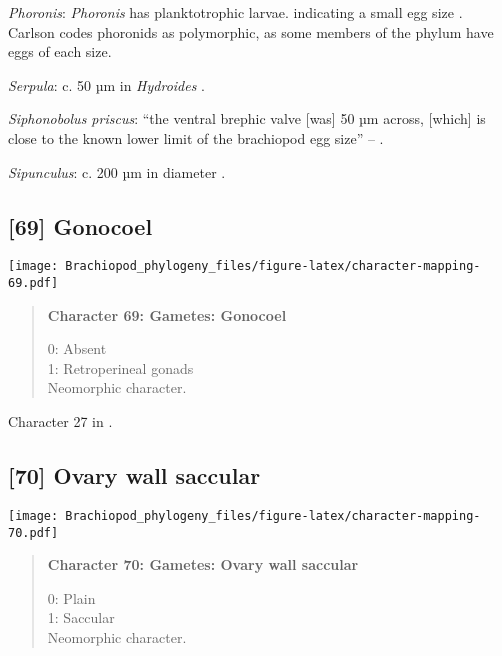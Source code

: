\documentclass[openany]{book}
\theoremstyle{definition}
\theoremstyle{definition}
\theoremstyle{definition}
\theoremstyle{remark}
\begin{document}
\hypertarget{Phoronis-coding-68}{}
\emph{Phoronis}: \emph{Phoronis} has planktotrophic larvae. indicating a
small egg size \citep{Ruppert2004Invertebratezoology}. Carlson
\citeyearpar{Carlson1995Phylogeneticrelationships} codes phoronids as
polymorphic, as some members of the phylum have eggs of each size.

\hypertarget{Serpula-coding-68}{}
\emph{Serpula}: c. 50 µm in \emph{Hydroides} \citep{Miles2007}.

\hypertarget{Siphonobolus_priscus-coding-68}{}
\emph{Siphonobolus priscus}: ``the ventral brephic valve {[}was{]} 50 µm
across, {[}which{]} is close to the known lower limit of the brachiopod
egg size'' -- \citet{Popov2009Earlyontogeny}.

\hypertarget{Sipunculus-coding-68}{}
\emph{Sipunculus}: c. 200 µm in diameter \citep{Rice1988}.

\subsection*{{[}69{]} Gonocoel}\label{gonocoel}

\texttt{[image: Brachiopod\_phylogeny\_files/figure-latex/character-mapping-69.pdf]}

\begin{quote}
\textbf{Character 69: Gametes: Gonocoel}

0: Absent\\
1: Retroperineal gonads\\
Neomorphic character.
\end{quote}

Character 27 in \citet{Haszprunar1996}.

\subsection*{{[}70{]} Ovary wall saccular}\label{ovary-wall-saccular}

\texttt{[image: Brachiopod\_phylogeny\_files/figure-latex/character-mapping-70.pdf]}

\begin{quote}
\textbf{Character 70: Gametes: Ovary wall saccular}

0: Plain\\
1: Saccular\\
Neomorphic character.
\end{quote}
\end{document}
